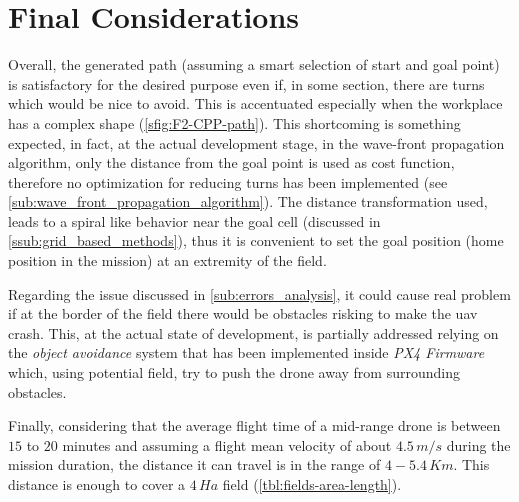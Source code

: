 \section{Final Considerations} %
\label{sec:considerations}
Overall, the generated path (assuming a smart selection of start and goal point) is satisfactory for the desired purpose even if, in some section, there are turns which would be nice to avoid. This is accentuated especially when the workplace has a complex shape (\autoref{sfig:F2-CPP-path}). This shortcoming is something expected, in fact, at the actual development stage, in the wave-front propagation algorithm, only the distance from the goal point is used as cost function, therefore no optimization for reducing turns has been implemented (see \autoref{sub:wave_front_propagation_algorithm}). The distance transformation used, leads to a spiral like behavior near the goal cell (discussed in \autoref{ssub:grid_based_methods}), thus it is convenient to set the goal position (home position in the mission) at an extremity of the field. \par
Regarding the issue discussed in \autoref{sub:errors_analysis}, it could cause real problem if at the border of the field there would be obstacles risking to make the \acrshort{uav} crash. This, at the actual state of development, is partially addressed relying on the \textit{object avoidance} system that has been implemented inside \textit{PX4 Firmware} which, using potential field, try to push the drone away from surrounding obstacles.\par
Finally, considering that the average flight time of a mid-range drone is between $15$ to $20$ minutes and assuming a flight mean velocity of about $4.5\, m/s$ during the mission duration, the distance it can travel is in the range of $4-5.4\, Km$. This distance is enough to cover a $4\, Ha$ field (\autoref{tbl:fields-area-length}).






















